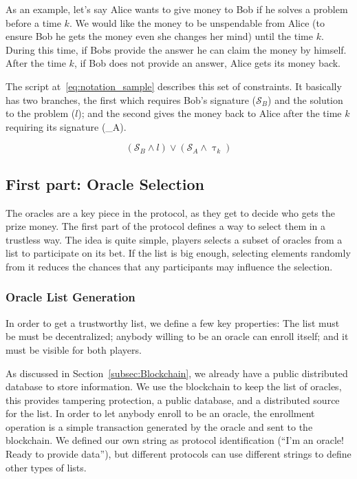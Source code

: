 As an example, let's say Alice wants to give money to Bob if he solves a problem
  before a time $k$.
We would like the money to be unspendable from Alice (to ensure Bob he gets the
  money even she changes her mind) until the time $k$.
During this time, if Bobs provide the answer he can claim the money by himself.
After the time $k$, if Bob does not provide an answer, Alice gets its money
  back.

The script at~\ref{eq:notation_sample} describes this set of constraints.
It basically has two branches, the first which requires Bob's signature
  ($\mathcal{S}_B$) and the solution to the problem ($l$); and the second gives
  the money back to Alice after the time $k$ requiring its signature
  (_A).

\begin{equation} \label{eq:notation_sample}
    (\mathcal{S}_B \wedge l) \vee (\mathcal{S}_A \wedge \uptau_k)
\end{equation}
\mathmode



\subsection{First part: Oracle Selection}

The oracles are a key piece in the protocol, as they get to decide who gets
  the prize money.
The first part of the protocol defines a way to select them in a trustless
  way.
The idea is quite simple, players selects a subset of oracles from a list
  to participate on its bet.
If the list is big enough, selecting elements randomly from it reduces the
  chances that any participants may influence the selection.

\subsubsection{Oracle List Generation}

In order to get a trustworthy list, we define a few key properties:
The list must be must be decentralized; anybody willing to be an oracle can
  enroll itself; and it must be visible for both players.

As discussed in Section~\ref{subsec:Blockchain}, we already have a public
  distributed database to store information.
We use the blockchain to keep the list of oracles, this provides tampering
  protection, a public database, and a distributed source for the list.
In order to let anybody enroll to be an oracle, the enrollment operation is a
  simple transaction generated by the oracle and sent to the blockchain.
We defined our own string as protocol identification
(``I'm an oracle! Ready to provide data''), but different protocols
  can use different strings to define other types of lists.

